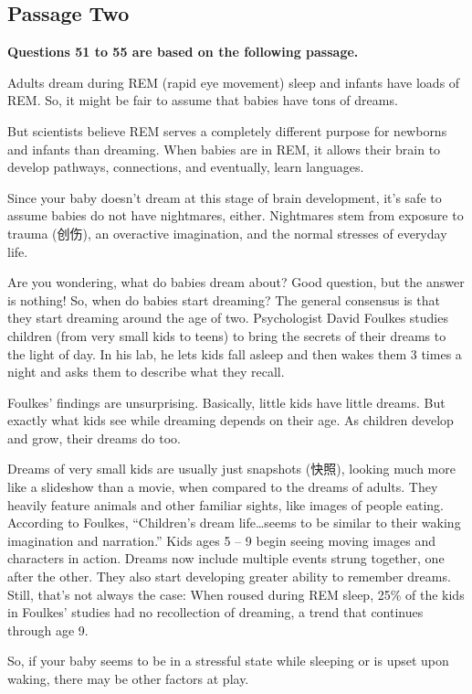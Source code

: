 \documentclass[UTF8,11pt]{ctexart}
\begin{document}
\subsection*{\textbf{Passage Two}}


\textbf{Questions 51 to 55 are based on the following passage.}


Adults dream during REM (rapid eye movement) sleep and infants have loads of REM. So, it might be fair to assume that babies have tons of dreams.


But scientists believe REM serves a completely different purpose for newborns and infants than dreaming. When babies are in REM, it allows their brain to develop pathways, connections, and eventually, learn languages.


Since your baby doesn’t dream at this stage of brain development, it’s safe to assume babies do not have nightmares, either. Nightmares stem from exposure to trauma (创伤), an overactive imagination, and the normal stresses of everyday life.


Are you wondering, what do babies dream about? Good question, but the answer is nothing! So, when do babies start dreaming? The general consensus is that they start dreaming around the age of two. Psychologist David Foulkes studies children (from very small kids to teens) to bring the secrets of their dreams to the light of day. In his lab, he lets kids fall asleep and then wakes them 3 times a night and asks them to describe what they recall.


Foulkes’ findings are unsurprising. Basically, little kids have little dreams. But exactly what kids see while dreaming depends on their age. As children develop and grow, their dreams do too.


Dreams of very small kids are usually just snapshots (快照), looking much more like a slideshow than a movie, when compared to the dreams of adults. They heavily feature animals and other familiar sights, like images of people eating. According to Foulkes, “Children’s dream life…seems to be similar to their waking imagination and narration.” Kids ages 5 – 9 begin seeing moving images and characters in action. Dreams now include multiple events strung together, one after the other. They also start developing greater ability to remember dreams. Still, that’s not always the case: When roused during REM sleep, 25\% of the kids in Foulkes’ studies had no recollection of dreaming, a trend that continues through age 9.


So, if your baby seems to be in a stressful state while sleeping or is upset upon waking, there may be other factors at play.
\end{document}
